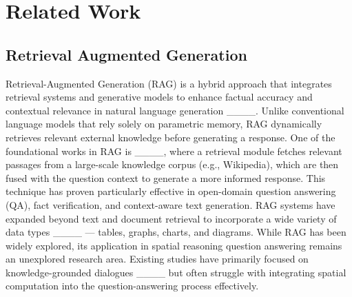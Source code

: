 \section{Related Work}
\subsection{Retrieval Augmented Generation}
Retrieval-Augmented Generation (RAG) is a hybrid approach that integrates retrieval systems and generative models to enhance factual accuracy and contextual relevance in natural language generation ____. Unlike conventional language models that rely solely on parametric memory, RAG dynamically retrieves relevant external knowledge before generating a response.
One of the foundational works in RAG is %
____, where a retrieval module fetches relevant passages from a large-scale knowledge corpus (e.g., Wikipedia), which are then fused with the question context to generate a more informed response. This technique has proven particularly effective in open-domain question answering (QA), fact verification, and context-aware text generation.
RAG systems have expanded beyond text and document retrieval to incorporate %
a wide variety of data types ____ — tables, graphs, charts, and diagrams. %
While RAG has been widely explored, its application in spatial reasoning question answering remains an unexplored research area. Existing studies have primarily focused on knowledge-grounded dialogues ____ but often struggle with integrating spatial computation into the question-answering process effectively.

